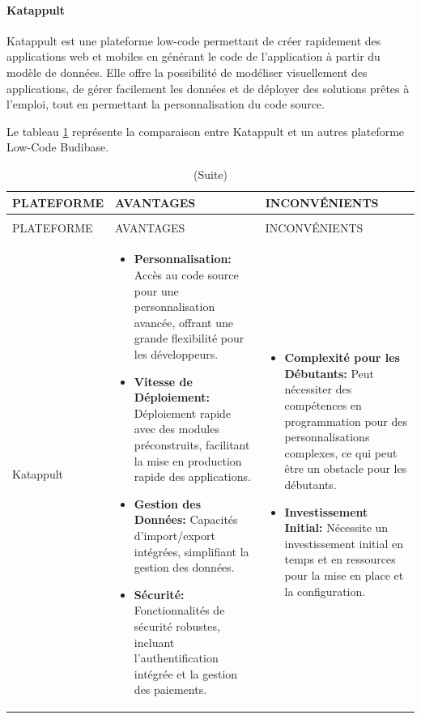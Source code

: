 \documentclass[12pt]{report}
\begin{document}
				\paragraph{Katappult}

				 Katappult est une plateforme low-code permettant de créer rapidement des applications web et mobiles en générant le code de l'application à partir du modèle de données. Elle offre la possibilité de modéliser visuellement des applications, de gérer facilement les données et de déployer des solutions prêtes à l’emploi, tout en permettant la personnalisation du code source.

				Le tableau \ref{tab:tableau 18} représente la comparaison entre Katappult et un autres plateforme Low-Code Budibase.

				\begin{longtable}{|p{3cm}|p{5.5cm}|p{5.5cm}|} 
						\caption{Comparaison entre Katappult et Budibase.} 
						\label{tab:tableau 18}\\ 
						\hline 
						PLATEFORME & AVANTAGES & INCONVÉNIENTS\\ 
						\hline 
						\endfirsthead 	
						\caption[]{(Suite)}\\ 
						\hline 
						PLATEFORME & AVANTAGES & INCONVÉNIENTS\\ 
						\hline 
						\endhead
						Katappult&
						\begin{itemize}
							\item \textbf{Personnalisation:} Accès au code source pour une personnalisation avancée, offrant une grande flexibilité pour les développeurs.
							\item \textbf{Vitesse de Déploiement:} Déploiement rapide avec des modules préconstruits, facilitant la mise en production rapide des applications.
							\item \textbf{Gestion des Données:} Capacités d'import/export intégrées, simplifiant la gestion des données.
							\item \textbf{Sécurité:} Fonctionnalités de sécurité robustes, incluant l'authentification intégrée et la gestion des paiements.
						\end{itemize}
						&
						\begin{itemize}
							\item \textbf{Complexité pour les Débutants:} Peut nécessiter des compétences en programmation pour des personnalisations complexes, ce qui peut être un obstacle pour les débutants.
							\item \textbf{Investissement Initial:} Nécessite un investissement initial en temps et en ressources pour la mise en place et la configuration.

\end{itemize}
\end{longtable}
\end{document}
